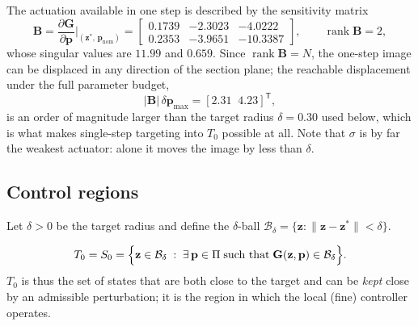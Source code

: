 The actuation available in one step is described by the sensitivity matrix
%
\begin{equation}
\mathbf{B}=\frac{\partial\mathbf{G}}{\partial\mathbf{p}}\bigg|_{(\mathbf{z}^{*},\,\mathbf{p}_{\mathrm{nom}})}
=\begin{bmatrix}
0.1739 & -2.3023 & -4.0222\\
0.2353 & -3.9651 & -10.3387
\end{bmatrix},
\qquad \operatorname{rank}\mathbf{B}=2 ,
\label{eq:sensitivity}
\end{equation}
%
whose singular values are $11.99$ and $0.659$. Since
$\operatorname{rank}\mathbf{B}=N$, the one-step image can be displaced in any
direction of the section plane; the reachable displacement under the full
parameter budget,
%
\begin{equation}
\bigl|\mathbf{B}\bigr|\,\delta\mathbf{p}_{\max}=[2.31\;\;4.23]^{\mathsf T},
\label{eq:reachable-displacement}
\end{equation}
%
is an order of magnitude larger than the target radius $\delta=0.30$ used
below, which is what makes single-step targeting into $T_0$ possible at all.
Note that $\sigma$ is by far the weakest actuator: alone it moves the image by
less than $\delta$.

\subsection{Control regions}
\label{subsec:ecr-regions}

Let $\delta>0$ be the target radius and define the $\delta$-ball
$\mathcal{B}_\delta=\{\mathbf{z}:\|\mathbf{z}-\mathbf{z}^{*}\|<\delta\}$.

\begin{definition}
\label{def:T0}
\begin{equation}
T_0=S_0=\Bigl\{\mathbf{z}\in\mathcal{B}_\delta\;:\;
\exists\,\mathbf{p}\in\Pi \;\text{such that}\; \mathbf{G}(\mathbf{z},\mathbf{p})\in\mathcal{B}_\delta\Bigr\}.
\label{eq:def-T0}
\end{equation}
$T_0$ is thus the set of states that are both close to the target and can be
\emph{kept} close by an admissible perturbation; it is the region in which the
local (fine) controller operates.
\end{definition}

